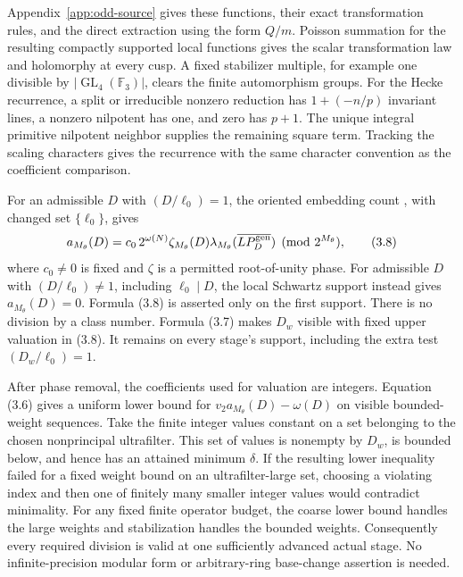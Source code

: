 \documentclass[11pt]{article}
\theoremstyle{definition}
\theoremstyle{remark}
\newcommand{\F}{\mathbb F}
\begin{document}
Appendix~\ref{app:odd-source} gives these functions, their exact
transformation rules, and the direct extraction using the form $Q/m$.
Poisson summation for the resulting compactly supported local functions
gives the scalar transformation law and holomorphy at every cusp.
A fixed stabilizer multiple, for example one divisible by
$|\operatorname{GL}_4(\F_3)|$, clears the finite automorphism groups.
For the Hecke recurrence, a split or irreducible nonzero reduction has
$1+(-n/p)$ invariant lines, a nonzero nilpotent has one, and zero has
$p+1$. The unique integral primitive nilpotent neighbor supplies the
remaining square term. Tracking the scaling characters gives the
recurrence with the same character convention as the coefficient
comparison.

For an admissible $D$ with $(D/\ell_0)=1$, the oriented embedding
count \cite[Theorem 3.1]{cornutjetchev}, with changed set $\{\ell_0\}$, gives
\[
 a_{M_\theta}(D)
   =c_0\,2^{\omega(N)}\zeta_{M_\theta}(D)
       \lambda_{M_\theta}(\overline{LP_D^{\rm gen}})
       \pmod {2^{M_\theta}},                                    \tag{3.8}
\]
where $c_0\ne0$ is fixed and $\zeta$ is a permitted root-of-unity phase.
For admissible $D$ with $(D/\ell_0)\ne1$, including $\ell_0\mid D$,
the local Schwartz support instead gives $a_{M_\theta}(D)=0$.
Formula (3.8) is asserted only on the first support.
There is no division by a class number. Formula (3.7) makes $D_w$
visible with fixed upper valuation in (3.8). It remains on every
stage's support, including the extra test $(D_w/\ell_0)=1$.

After phase removal, the coefficients used for valuation are integers.
Equation (3.6) gives a uniform lower bound for
$v_2a_{M_\theta}(D)-\omega(D)$ on visible bounded-weight sequences.
Take the finite integer values constant on a set belonging to the
chosen nonprincipal ultrafilter. This set of values is nonempty by
$D_w$, is bounded below, and hence has an attained minimum $\delta$.
If the resulting lower inequality failed for a fixed weight bound on
an ultrafilter-large set, choosing a violating index and then one of
finitely many smaller integer values would contradict minimality.
For any fixed finite operator budget, the coarse lower bound handles
the large weights and stabilization handles the bounded weights.
Consequently every required division is valid at one sufficiently
advanced actual stage. No infinite-precision modular form or
arbitrary-ring base-change assertion is needed.
\end{document}
